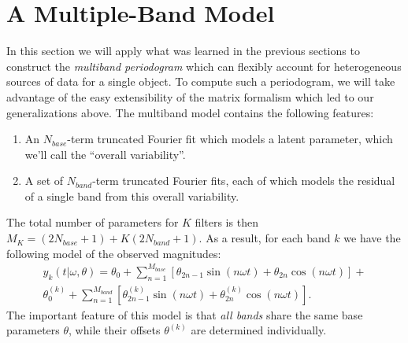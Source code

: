 \documentclass{emulateapj}
\newcommand{\eqlabel}[1]{\label{eq:#1}}
\newcommand{\sectlabel}[1]{\label{sect:#1}}
\begin{document}
\section{A Multiple-Band Model}
\sectlabel{multiband}
In this section we will apply what was learned in the previous sections to construct the {\it multiband periodogram} which can flexibly account for heterogeneous sources of data for a single object.
To compute such a periodogram, we will take advantage of the easy extensibility of the matrix formalism which led to our generalizations above.
The multiband model contains the following features:
\begin{enumerate}
  \item An $N_{base}$-term truncated Fourier fit which models a latent parameter, which we'll call the ``overall variability''.
  \item A set of $N_{band}$-term truncated Fourier fits, each of which models the residual of a single band from this overall variability.
\end{enumerate}
The total number of parameters for $K$ filters is then $M_K = (2N_{base} + 1) + K(2N_{band} + 1)$. As a result, for each band $k$ we have the following model of the observed magnitudes:
\begin{eqnarray}
  \eqlabel{multiband_model}
  &y_k(t|\omega,\theta) =
  \theta_0 + \sum_{n=1}^{M_{base}} \left[\theta_{2n - 1}\sin(n\omega t) + \theta_{2n}\cos(n\omega t)\right] +&\nonumber\\ 
  &\theta^{(k)}_0 + \sum_{n=1}^{M_{band}} \left[\theta^{(k)}_{2n - 1}\sin(n\omega t) + \theta^{(k)}_{2n}\cos(n\omega t)\right].&
\end{eqnarray}
The important feature of this model is that {\it all bands} share the same base parameters $\theta$, while their offsets $\theta^{(k)}$ are determined individually.
\end{document}
